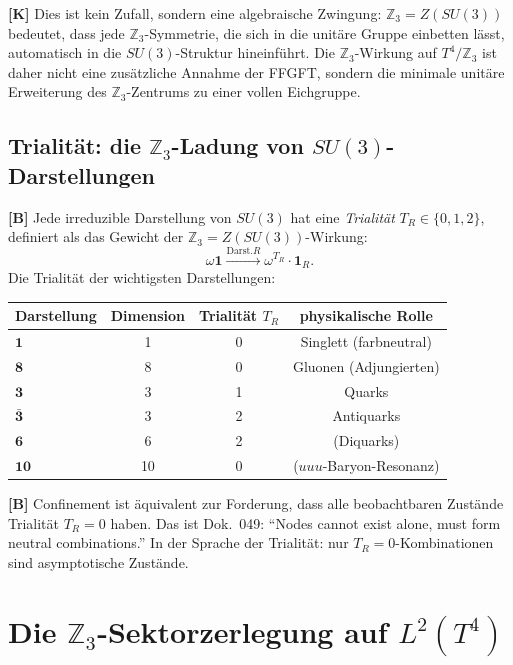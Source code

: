 \textbf{[K]} Dies ist kein Zufall, sondern eine algebraische Zwingung:
$\mathbb{Z}_3 = Z(SU(3))$ bedeutet, dass jede $\mathbb{Z}_3$-Symmetrie,
die sich in die unitäre Gruppe einbetten lässt, automatisch in die
$SU(3)$-Struktur hineinführt. Die $\mathbb{Z}_3$-Wirkung auf
$T^4/\mathbb{Z}_3$ ist daher nicht eine zusätzliche Annahme der FFGFT,
sondern die minimale unitäre Erweiterung des $\mathbb{Z}_3$-Zentrums
zu einer vollen Eichgruppe.

\subsection{Trialität: die $\mathbb{Z}_3$-Ladung von $SU(3)$-Darstellungen}

\textbf{[B]} Jede irreduzible Darstellung von $SU(3)$ hat eine
\emph{Trialität} $T_R \in \{0, 1, 2\}$, definiert als das Gewicht
der $\mathbb{Z}_3 = Z(SU(3))$-Wirkung:
\begin{equation}
  \omega\mathbf{1} \xrightarrow{\text{Darst.} R}
  \omega^{T_R}\cdot\mathbf{1}_R.
  \label{eq:trialitaet}
\end{equation}
Die Trialität der wichtigsten Darstellungen:
\begin{center}
\begin{tabular}{lccc}
\toprule
Darstellung & Dimension & Trialität $T_R$ & physikalische Rolle \\
\midrule
$\mathbf{1}$ & 1  & 0 & Singlett (farbneutral) \\
$\mathbf{8}$ & 8  & 0 & Gluonen (Adjungierten) \\
$\mathbf{3}$ & 3  & 1 & Quarks \\
$\bar{\mathbf{3}}$ & 3 & 2 & Antiquarks \\
$\mathbf{6}$ & 6  & 2 & (Diquarks) \\
$\mathbf{10}$ & 10 & 0 & ($uuu$-Baryon-Resonanz) \\
\bottomrule
\end{tabular}
\end{center}

\textbf{[B]} Confinement ist äquivalent zur Forderung, dass alle
beobachtbaren Zustände Trialität $T_R = 0$ haben. Das ist Dok.~049:
``Nodes cannot exist alone, must form neutral combinations.''
In der Sprache der Trialität: nur $T_R = 0$-Kombinationen sind
asymptotische Zustände.

\section{Die $\mathbb{Z}_3$-Sektorzerlegung auf $L^2(T^4)$}

